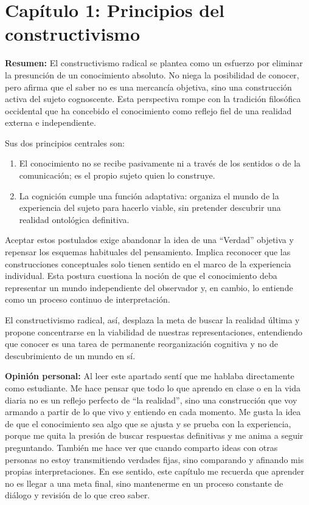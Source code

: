 \documentclass{article}
\begin{document}
\tableofcontents  \vspace{2cm}

\section*{Capítulo 1: Principios del constructivismo}

\textbf{Resumen:}  
El constructivismo radical se plantea como un esfuerzo por eliminar la presunción de un conocimiento absoluto. No niega la posibilidad de conocer, pero afirma que el saber no es una mercancía objetiva, sino una construcción activa del sujeto cognoscente. Esta perspectiva rompe con la tradición filosófica occidental que ha concebido el conocimiento como reflejo fiel de una realidad externa e independiente.

Sus dos principios centrales son:
\begin{enumerate}
\item El conocimiento no se recibe pasivamente ni a través de los sentidos o de la comunicación; es el propio sujeto quien lo construye.
\item La cognición cumple una función adaptativa: organiza el mundo de la experiencia del sujeto para hacerlo viable, sin pretender descubrir una realidad ontológica definitiva.
\end{enumerate}

Aceptar estos postulados exige abandonar la idea de una “Verdad” objetiva y repensar los esquemas habituales del pensamiento. Implica reconocer que las construcciones conceptuales solo tienen sentido en el marco de la experiencia individual. Esta postura cuestiona la noción de que el conocimiento deba representar un mundo independiente del observador y, en cambio, lo entiende como un proceso continuo de interpretación.

El constructivismo radical, así, desplaza la meta de buscar la realidad última y propone concentrarse en la viabilidad de nuestras representaciones, entendiendo que conocer es una tarea de permanente reorganización cognitiva y no de descubrimiento de un mundo en sí.

\textbf{Opinión personal:}  
Al leer este apartado sentí que me hablaba directamente como estudiante. Me hace pensar que todo lo que aprendo en clase o en la vida diaria no es un reflejo perfecto de “la realidad”, sino una construcción que voy armando a partir de lo que vivo y entiendo en cada momento. Me gusta la idea de que el conocimiento sea algo que se ajusta y se prueba con la experiencia, porque me quita la presión de buscar respuestas definitivas y me anima a seguir preguntando. También me hace ver que cuando comparto ideas con otras personas no estoy transmitiendo verdades fijas, sino comparando y afinando mis propias interpretaciones. En ese sentido, este capítulo me recuerda que aprender no es llegar a una meta final, sino mantenerme en un proceso constante de diálogo y revisión de lo que creo saber.
\end{document}
